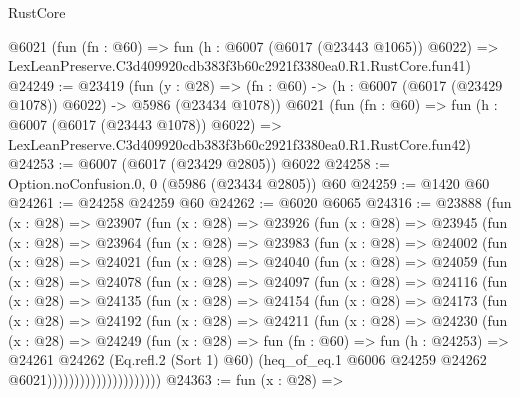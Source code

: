 \begin{lexlean}{RustCore}
\begin{coremodule}
    @6021
    (fun (fn : @60) =>
    fun (h : @6007 (@6017 (@23443 @1065)) @6022) =>
    LexLeanPreserve.C3d409920cdb383f3b60c2921f3380ea0.R1.RustCore.fun41)
@24249 := @23419
    (fun (y : @28) =>
    (fn : @60) -> (h : @6007 (@6017 (@23429 @1078)) @6022) -> @5986 (@23434 @1078))
    @6021
    (fun (fn : @60) =>
    fun (h : @6007 (@6017 (@23443 @1078)) @6022) =>
    LexLeanPreserve.C3d409920cdb383f3b60c2921f3380ea0.R1.RustCore.fun42)
@24253 := @6007 (@6017 (@23429 @2805)) @6022
@24258 := Option.noConfusion.{0, 0} (@5986 (@23434 @2805)) @60
@24259 := @1420 @60
@24261 := @24258 @24259 @60
@24262 := @6020 @6065
@24316 := @23888
    (fun (x : @28) =>
    @23907
      (fun (x : @28) =>
      @23926
        (fun (x : @28) =>
        @23945
          (fun (x : @28) =>
          @23964
            (fun (x : @28) =>
            @23983
              (fun (x : @28) =>
              @24002
                (fun (x : @28) =>
                @24021
                  (fun (x : @28) =>
                  @24040
                    (fun (x : @28) =>
                    @24059
                      (fun (x : @28) =>
                      @24078
                        (fun (x : @28) =>
                        @24097
                          (fun (x : @28) =>
                          @24116
                            (fun (x : @28) =>
                            @24135
                              (fun (x : @28) =>
                              @24154
                                (fun (x : @28) =>
                                @24173
                                  (fun (x : @28) =>
                                  @24192
                                    (fun (x : @28) =>
                                    @24211
                                      (fun (x : @28) =>
                                      @24230
                                        (fun (x : @28) =>
                                        @24249
                                          (fun (x : @28) =>
                                          fun (fn : @60) =>
                                          fun (h : @24253) =>
                                          @24261
                                            @24262
                                            (Eq.refl.{2} (Sort 1) @60)
                                            (heq_of_eq.{1}
                                              @6006
                                              @24259
                                              @24262
                                              @6021)))))))))))))))))))))
@24363 := fun (x : @28) =>

\end{coremodule}
\end{lexlean}
